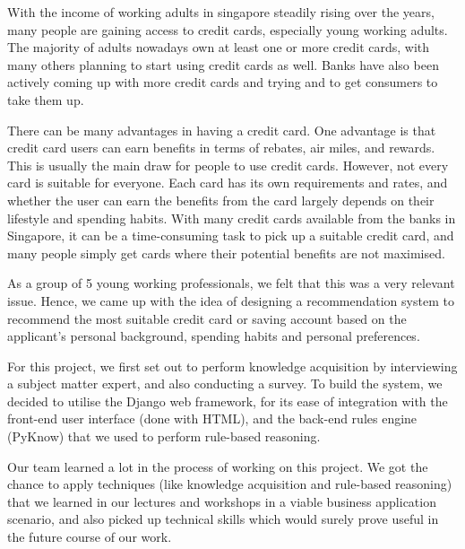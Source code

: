 With the income of working adults in singapore steadily rising over the years, many people are gaining access to credit cards, especially young working adults. The majority of adults nowadays own at least one or more credit cards, with many others planning to start using credit cards as well. Banks have also been actively coming up with more credit cards and trying and to get consumers to take them up.

There can be many advantages in having a credit card. One advantage is that credit card users can earn benefits in terms of rebates, air miles, and rewards. This is usually the main draw for people to use credit cards. However, not every card is suitable for everyone. Each card has its own requirements and rates, and whether the user can earn the benefits from the card largely depends on their lifestyle and spending habits. With many credit cards available from the banks in Singapore, it can be a time-consuming task to pick up a suitable credit card, and many people simply get cards where their potential benefits are not maximised.

As a group of 5 young working professionals, we felt that this was a very relevant issue. Hence, we came up with the idea of designing a recommendation system to recommend the most suitable credit card or saving account based on the applicant's personal background, spending habits and personal preferences.

For this project, we first set out to perform knowledge acquisition by interviewing a subject matter expert, and also conducting a survey. To build the system, we decided to utilise the Django web framework, for its ease of integration with the front-end user interface (done with HTML), and the back-end rules engine (PyKnow) that we used to perform rule-based reasoning.

Our team learned a lot in the process of working on this project. We got the chance to apply techniques (like knowledge acquisition and rule-based reasoning) that we learned in our lectures and workshops in a viable business application scenario, and also picked up technical skills which would surely prove useful in the future course of our work.
